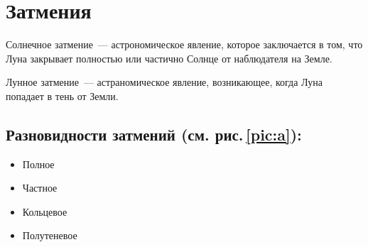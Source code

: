 \documentclass{article}
\begin{document}
    \section{Затмения}
    \hspace*{12pt} Солнечное затмение~--- астрономическое явление, которое заключается в том, что Луна закрывает полностью или частично Солнце от наблюдателя на Земле.\par
    Лунное затмение~--- астраномическое явление, возникающее, когда Луна попадает в тень от Земли.\par
    \subsection*{Разновидности затмений (см. рис.\,\ref{pic:a}):}
    \begin{itemize}
    	\item Полное 
    	\item Частное
    	\item Кольцевое
    	\item Полутеневое
    \end{itemize}
\end{document}
